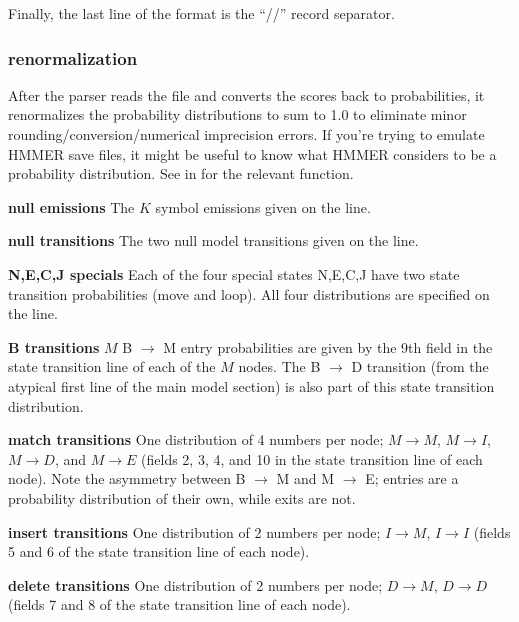 Finally, the last line of the format is the ``//'' record separator.

\subsubsection{renormalization}

After the parser reads the file and converts the scores back to
probabilities, it renormalizes the probability distributions to sum to
1.0 to eliminate minor rounding/conversion/numerical imprecision
errors.  If you're trying to emulate HMMER save files, it might be
useful to know what HMMER considers to be a probability
distribution. See
 in  for the relevant
function.

\begin{wideitem}

\item [\textbf{null emissions}] The $K$ symbol emissions 
given on the  line.

\item [\textbf{null transitions}] The two null model transitions
given on the  line.

\item [\textbf{N,E,C,J specials}] Each of the four special states N,E,C,J have two
state transition probabilities (move and loop). All four distributions
are specified on the  line.

\item [\textbf{B transitions}] $M$ B $\rightarrow$
M entry probabilities are given by the 9th field in the state
transition line of each of the $M$ nodes. The B $\rightarrow$ D
transition (from the atypical first line of the main model section) is
also part of this state transition distribution.

\item [\textbf{match transitions}] One distribution of 4 numbers per node; $M \rightarrow M$, 
$M \rightarrow I$, $M \rightarrow D$, and $M \rightarrow E$ (fields 2,
3, 4, and 10 in the state transition line of each node). Note the
asymmetry between B $\rightarrow$ M and M $\rightarrow$ E; entries are
a probability distribution of their own, while exits are not.

\item [\textbf{insert transitions}] One distribution of 2 numbers per node; $I \rightarrow M$, 
$I \rightarrow I$ (fields 5 and 6 of the state transition line of each
node).

\item [\textbf{delete transitions}] One distribution of 2 numbers per
node; $D \rightarrow M$, $D \rightarrow D$ (fields 7 and 8 of the
state transition line of each node).


\end{wideitem}
